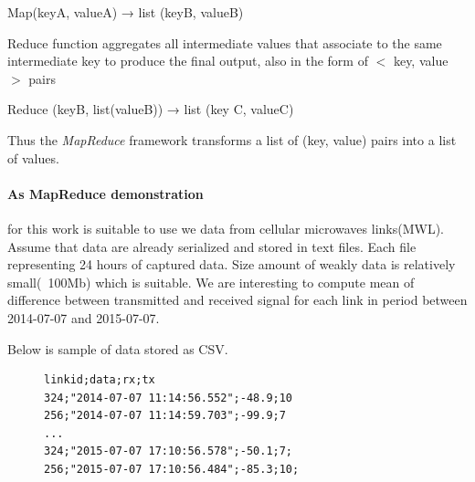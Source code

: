 \documentclass[a4paper,12pt,oneside]{report}
\begin{document}
\begin{center}
Map(keyA, valueA) → list (keyB, valueB)
\end{center}
Reduce function aggregates all intermediate values that associate to the same intermediate key
to produce the final output, also in the form of $<$ key, value $>$ pairs
\begin{center}
Reduce (keyB, list(valueB)) → list (key C, valueC)
\end{center}
Thus the \emph{MapReduce} framework transforms a list of (key, value) pairs into a list of values. 
%


\paragraph{As MapReduce demonstration} for this work is suitable to use we data from cellular microwaves links(MWL). 
Assume that data are already serialized and stored in text files. Each file representing 24 hours of captured data. 
Size amount of weakly data is relatively small(~100Mb) which is suitable.
We are interesting to compute mean of difference between transmitted and received signal
 for each link in period between 2014-07-07 and 2015-07-07.

Below is sample of data stored as CSV.
\begin{figure}[h!]
\begin{footnotesize}
\lstset{extendedchars=false,
escapeinside=''}
\begin{lstlisting}[style=mybash]
linkid;data;rx;tx
324;"2014-07-07 11:14:56.552";-48.9;10
256;"2014-07-07 11:14:59.703";-99.9;7
...
324;"2015-07-07 17:10:56.578";-50.1;7;
256;"2015-07-07 17:10:56.484";-85.3;10;
\end{lstlisting}
\end{footnotesize} 
\end{figure}
\end{document}
